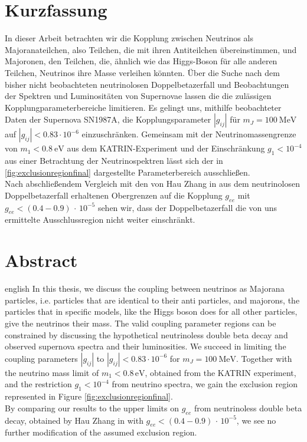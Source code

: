 \thispagestyle{plain}

\section*{Kurzfassung}
In dieser Arbeit betrachten wir die Kopplung zwischen Neutrinos als Majoranateilchen, also Teilchen, die mit ihren Antiteilchen übereinstimmen, und Majoronen, den Teilchen, die,
ähnlich wie das Higgs-Boson für alle anderen Teilchen, Neutrinos ihre Masse verleihen könnten.
Über die Suche nach dem bisher nicht beobachteten neutrinolosen Doppelbetazerfall und Beobachtungen der Spektren und Luminositäten von Supernovae lassen die die zulässigen Kopplungparameterbereiche limitieren.
Es gelingt uns, mithilfe beobachteter Daten der Supernova SN1987A, die Kopplungsparameter $|g_{i j}|$ für $m_J = \SI{100}{\mega\eV}$ auf $|g_{i j}| < \num{0.83} \cdot 10^{-6}$ einzuschränken.
Gemeinsam mit der Neutrinomassengrenze von $m_1 < \SI{0.8}{\eV}$ aus dem KATRIN-Experiment und der Einschränkung $g_1 < 10^{-4}$ aus einer Betrachtung der Neutrinospektren lässt sich der in \autoref{fig:exclusionregionfinal}
dargestellte Parameterbereich ausschließen. \\
Nach abschließendem Vergleich mit den von Hau Zhang in \cite{hauhau} aus dem neutrinolosen Doppelbetazerfall erhaltenen Obergrenzen auf die Kopplung $g_{ee}$ mit $g_{ee} < \left(\num{0.4} - \num{0.9}\right) \, \cdot \, 10^{-5}$ sehen wir, dass
der Doppelbetazerfall die von uns ermittelte Ausschlussregion nicht weiter einschränkt.

\section*{Abstract}
\begin{foreignlanguage}{english}
In this thesis, we discuss the coupling between neutrinos as Majorana particles, i.e. particles that are identical to their anti particles, and majorons, the particles that in specific models, like the Higgs boson does for all other
particles, give the neutrinos their mass.
The valid coupling parameter regions can be constrained by discussing the hypothetical neutrinoless double beta decay and observed supernova spectra and their luminosities.
We succeed in limiting the coupling parameters $|g_{i j}|$ to $|g_{i j}| < 0.83 \cdot 10^{-6}$ for $m_J = \SI{100}{\mega\eV}$.
Together with the neutrino mass limit of $m_1 < 0.8 \,\si{\eV}$, obtained from the KATRIN experiment, and the restriction $g_1 < 10^{-4}$ from neutrino spectra, we gain the exclusion region represented in Figure
\ref{fig:exclusionregionfinal}. \\
By comparing our results to the upper limits on $g_{ee}$ from neutrinoless double beta decay, obtained by Hau Zhang in \cite{hauhau} with $g_{ee} < \left(\num{0.4} - \num{0.9}\right) \, \cdot \, 10^{-5}$, we see no further
modification of the assumed exclusion region.
\end{foreignlanguage}
